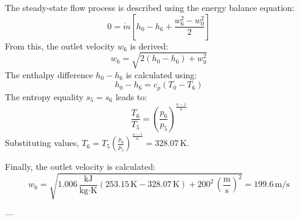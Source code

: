 The steady-state flow process is described using the energy balance equation:  
\[
0 = \dot{m} \left[ h_0 - h_6 + \frac{w_6^2 - w_0^2}{2} \right]
\]  
From this, the outlet velocity \( w_6 \) is derived:  
\[
w_6 = \sqrt{2 \left( h_0 - h_6 \right) + w_0^2}
\]  
The enthalpy difference \( h_0 - h_6 \) is calculated using:  
\[
h_0 - h_6 = c_p \left( T_0 - T_6 \right)
\]  
The entropy equality \( s_5 = s_6 \) leads to:  
\[
\frac{T_6}{T_5} = \left( \frac{p_6}{p_5} \right)^{\frac{\kappa - 1}{\kappa}}
\]  
Substituting values, \( T_6 = T_5 \left( \frac{p_6}{p_5} \right)^{\frac{\kappa - 1}{\kappa}} = 328.07 \, \text{K} \).

Finally, the outlet velocity is calculated:  
\[
w_6 = \sqrt{1.006 \, \frac{\text{kJ}}{\text{kg·K}} \left( 253.15 \, \text{K} - 328.07 \, \text{K} \right) + 200^2 \, \left( \frac{\text{m}}{\text{s}} \right)^2} = 199.6 \, \text{m/s}
\]

---